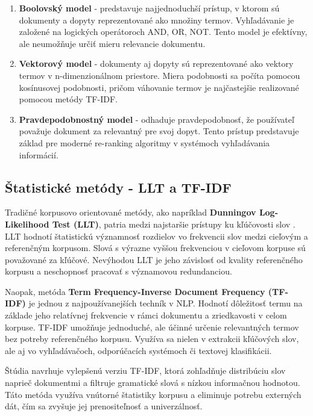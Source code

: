 \documentclass[a4paper,12pt]{article}
\begin{document}
\begin{enumerate}
    \item \textbf{Boolovský model} - predstavuje najjednoduchší prístup, v ktorom sú dokumenty a dopyty reprezentované ako množiny termov. Vyhľadávanie je založené na logických operátoroch AND, OR, NOT. Tento model je efektívny, ale neumožňuje určiť mieru relevancie dokumentu.
    
    \item \textbf{Vektorový model} - dokumenty aj dopyty sú reprezentované ako vektory termov v n-dimenzionálnom priestore. Miera podobnosti sa počíta pomocou kosínusovej podobnosti, pričom váhovanie termov je najčastejšie realizované pomocou metódy TF-IDF.
    
    \item \textbf{Pravdepodobnostný model} - odhaduje pravdepodobnosť, že používateľ považuje dokument za relevantný pre svoj dopyt. Tento prístup predstavuje základ pre moderné re-ranking algoritmy v systémoch vyhľadávania informácií.
\end{enumerate}

\subsection{Štatistické metódy - LLT a TF-IDF}

Tradičné korpusovo orientované metódy, ako napríklad \textbf{Dunningov Log-Likelihood Test (LLT)}, patria medzi najstaršie prístupy ku kľúčovosti slov \cite{dunning1993accurate}. LLT hodnotí štatistickú významnosť rozdielov vo frekvencii slov medzi cieľovým a referenčným korpusom. Slová s výrazne vyššou frekvenciou v cieľovom korpuse sú považované za kľúčové. Nevýhodou LLT je jeho závislosť od kvality referenčného korpusu a neschopnosť pracovať s významovou redundanciou.

Naopak, metóda \textbf{Term Frequency-Inverse Document Frequency (TF-IDF)} \cite{salton1988term} je jednou z najpoužívanejších techník v NLP. Hodnotí dôležitosť termu na základe jeho relatívnej frekvencie v rámci dokumentu a zriedkavosti v celom korpuse. TF-IDF umožňuje jednoduché, ale účinné určenie relevantných termov bez potreby referenčného korpusu. Využíva sa nielen v extrakcii kľúčových slov, ale aj vo vyhľadávačoch, odporúčacích systémoch či textovej klasifikácii.

Štúdia \cite{rose2011tfidf} navrhuje vylepšenú verziu TF-IDF, ktorá zohľadňuje distribúciu slov naprieč dokumentmi a filtruje gramatické slová s nízkou informačnou hodnotou. Táto metóda využíva vnútorné štatistiky korpusu a eliminuje potrebu externých dát, čím sa zvyšuje jej prenositeľnosť a univerzálnosť.
\end{document}
